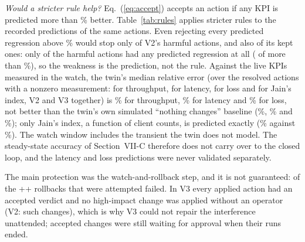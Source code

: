 \documentclass[conference]{IEEEtran}
\begin{document}
\emph{Would a stricter rule help?} Eq.~(\ref{eq:accept}) accepts an action if any KPI is predicted more than \CfgChangePct\% better. Table~\ref{tab:rules} applies stricter rules to the recorded predictions of the same actions. Even rejecting every predicted regression above \CfgChangePct\% would stop only \RuleNoRegHarm{} of V2's \HarmAll{} harmful actions, and also \RuleNoRegKept{} of its \KeptAll{} kept ones: only \HarmAnyRegress{} of the \HarmAll{} harmful actions had any predicted regression at all (\RuleNoRegHarm{} of more than \CfgChangePct\%), so the weakness is the prediction, not the rule. Against the live KPIs measured in the watch, the twin's median relative error (over the resolved actions with a nonzero measurement: \LiveThrN{} for throughput, \LiveLatN{} for latency, \LiveLossN{} for loss and \LiveJainN{} for Jain's index, V2 and V3 together) is \LiveThrErr\% for throughput, \LiveLatErr\% for latency and \LiveLossErr\% for loss, not better than the twin's own simulated ``nothing changes'' baseline (\LiveThrBase\%, \LiveLatBase\% and \LiveLossBase\%); only Jain's index, a function of client counts, is predicted exactly (\LiveJainErr\% against \LiveJainBase\%). The watch window includes the transient the twin does not model. The steady-state accuracy of Section~VII-C therefore does not carry over to the closed loop, and the latency and loss predictions were never validated separately.

The main protection was the watch-and-rollback step, and it is not guaranteed: \RbFailAll{} of the \the\numexpr\LedVtwoRolledBack+\LedVthreeRolledBack+\RbFailAll\relax{} rollbacks that were attempted failed. In V3 every applied action had an accepted verdict and no high-impact change was applied without an operator (V2: \SafeVtwoHighImpactUnapproved{} such changes), which is why V3 could not repair the interference unattended; \LedVthreeWaiting{} accepted changes were still waiting for approval when their runs ended.

\begin{table}[t]
\caption{Fate of every action in the passed runs (nine runs per variant), from the executor ledgers. V2 applies actions whatever the twin said (the twin had rejected \SafeVtwoAppliedTwinRejected{} of them), so none shows as rejected there. V2's \the\numexpr\LedVtwoKept+\LedVtwoRolledBack+\LedVtwoRollbackFailed\relax{} resolved actions are \HarmAll{} harmful (\LedVtwoRolledBack{} rolled back, \LedVtwoRollbackFailed{} failed rollback) and \KeptAll{} kept; the twin had rejected \VtwoRejHarm{} harmful and \the\numexpr\VtwoRejTotal-\VtwoRejHarm\relax{} kept. The \the\numexpr\HarmAccepted+\HarmVthree\relax{} harmful actions applied after an accepted verdict are V2's \HarmAccepted{} and V3's \HarmVthree{}.}
\label{tab:actions}
\centering

\end{table}
\end{document}
